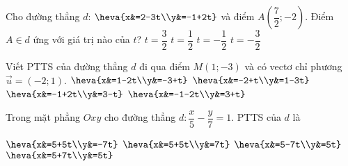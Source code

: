 \begin{ex}%
	Cho đường thẳng $d$: $\heva{x&=2-3t\\y&=-1+2t}$ và điểm $A\left(\dfrac{7}{2};-2\right)$. Điểm $A\in d$ ứng với giá trị nào của $t$?
	\choice
	{$t=\dfrac{3}{2}$}
	{$t=\dfrac{1}{2}$}
	{\True $t=-\dfrac{1}{2}$}
	{$t=-\dfrac{3}{2}$}
\end{ex}

\begin{ex}%
	Viết PTTS của đường thẳng $d$ đi qua điểm $M(1;-3)$ và có vectơ chỉ phương $\overrightarrow{u}=(-2;1)$.
	\choice
	{\True $\heva{x&=1-2t\\y&=-3+t}$}
	{$\heva{x&=-2+t\\y&=1-3t}$}
	{$\heva{x&=-1+2t\\y&=3-t}$}
	{$\heva{x&=-1-2t\\y&=3+t}$}
\end{ex}


\begin{ex}%
	Trong mặt phẳng $Oxy$ cho đường thẳng $d\colon \dfrac{x}{5}-\dfrac{y}{7}=1$. PTTS của $d$ là
	
	\choice
	{$\heva{x&=5+5t\\y&=-7t}$}
	{\True $\heva{x&=5+5t\\y&=7t}$}
	{$\heva{x&=5-7t\\y&=5t}$}
	{$\heva{x&=5+7t\\y&=5t}$}
\end{ex}

